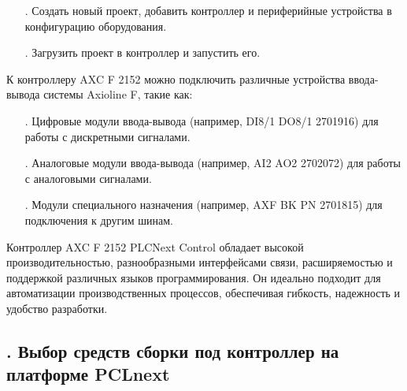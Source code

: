{\begin{itemize}[leftmargin=2.15cm, labelwidth=0.65cm, labelsep=0.0cm]
		\item[\theitemcntr. ] Создать новый проект, добавить контроллер и периферийные устройства в конфигурацию оборудования.
		\addtocounter{itemcntr}{1}

		\item[\theitemcntr. ] Загрузить проект в контроллер и запустить его.
		\addtocounter{itemcntr}{1}

	\end{itemize} \setcounter{itemcntr}{1}

	\par \redline К контроллеру AXC F 2152 можно подключить различные устройства ввода-вывода системы Axioline F, такие как:

	\begin{itemize}[leftmargin=2.15cm, labelwidth=0.65cm, labelsep=0.0cm] 

		\item[\theitemcntr. ] Цифровые модули ввода-вывода (например, DI8/1 DO8/1 2701916) для работы с дискретными сигналами. 
		\addtocounter{itemcntr}{1}

		\item[\theitemcntr. ] Аналоговые модули ввода-вывода (например, AI2 AO2 2702072) для работы с аналоговыми сигналами. 
		\addtocounter{itemcntr}{1}

		\item[\theitemcntr. ] Модули специального назначения (например, AXF BK PN 2701815) для подключения к другим шинам.
		\addtocounter{itemcntr}{1}

	\end{itemize} \setcounter{itemcntr}{1}

	\par \redline Контроллер AXC F 2152 PLCNext Control обладает высокой производительностью, разнообразными интерфейсами связи, расширяемостью и поддержкой различных языков программирования. Он идеально подходит для автоматизации производственных процессов, обеспечивая гибкость, надежность и удобство разработки.

	\par
}

\subtitlespace

\subsection*{
	\gostTitleFont
	\redline
	\thechaptercntr .\thesubchaptercntr \spc
	Выбор средств сборки под контроллер на платформе PCLnext
} \addtocounter{subchaptercntr}{1}


